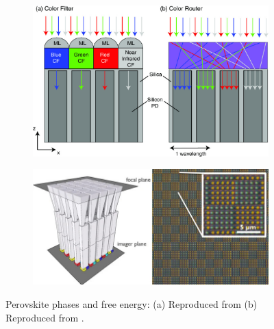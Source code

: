 \begin{figure}[htbp]
    \centering
    \begin{subfigure}[t]{0.49\textwidth} %
        \centering
        \includegraphics[width=\textwidth]{chapters/introduction/image/color_router.jpg} %
        \caption{}
        \label{fig:ch1:color_routing_concept}
    \end{subfigure}
    \hfill %
    \begin{subfigure}[t]{0.49\textwidth} %
        \centering
        \includegraphics[width=\textwidth]{chapters/introduction/image/gigapixel_waveguide.jpg} %
        \caption{}
        \label{fig:ch1:gigalixel:waveguide}
    \end{subfigure}

    \caption{Perovskite phases and free energy: (a) Reproduced from \cite{Zhao2021PerfectPixels} (b) Reproduced from \cite{Kang2017HighCsPbBr3}.}
    \label{fig:ch1:color_splitting}
\end{figure}


